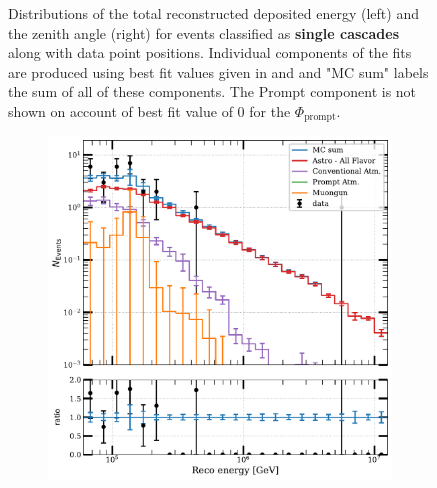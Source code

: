\begin{figure}[h]
\begin{subfigure}[h]{0.7\textwidth}
    \end{subfigure}%
    \caption{Distributions of the total reconstructed deposited energy (left) and the zenith angle (right) for events classified as \textbf{single cascades} along with data point positions. Individual components of the fits are produced using best fit values given in  and  and "MC sum" labels the sum of all of these components. The Prompt component is not shown on account of best fit value of 0 for the $\Phi_{\mathrm{prompt}}$.}
\end{figure}

\begin{figure}[h!]
    \begin{subfigure}[h]{0.7\textwidth}
        \includegraphics{./figures/results/DataMC_IC86_pass2_SnowStorm_v2_Bfr_Tracks_energy.pdf}
    \end{subfigure}
    \hfill
    \begin{subfigure}[h]{0.7\textwidth}

\end{subfigure}
\end{figure}
